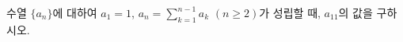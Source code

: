 수열 $\{a_n\}$에 대하여 $a_1=1$, $a_n=\displaystyle\sum_{k=1}^{n-1}a_k$ $(n\ge 2)$가 성립할 때, $a_{11}$의 값을 구하시오.

